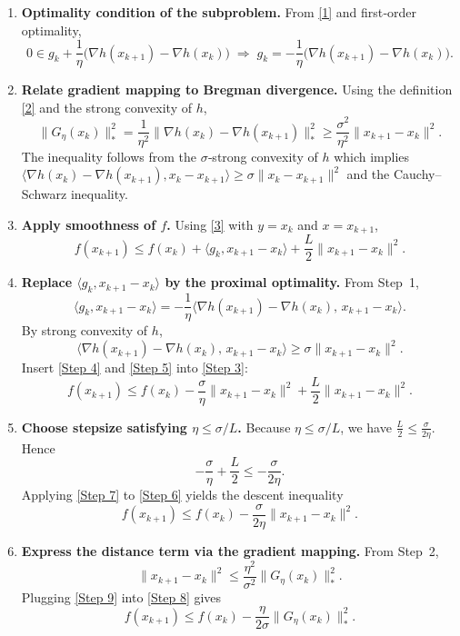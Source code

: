 \documentclass{article}
\begin{document}
\begin{enumerate}
\item \textbf{Optimality condition of the subproblem.}  
From \eqref{1} and first‑order optimality,
\[
0\in g_k+\frac{1}{\eta}\bigl(\nabla h(x_{k+1})-\nabla h(x_k)\bigr)
\;\Longrightarrow\;
g_k = -\frac{1}{\eta}\bigl(\nabla h(x_{k+1})-\nabla h(x_k)\bigr).
\tag{Step 1}
\]
\item \textbf{Relate gradient mapping to Bregman divergence.}  
Using the definition \eqref{2} and the strong convexity of $h$,
\[
\|G_{\eta}(x_k)\|_{*}^{2}
= \frac{1}{\eta^{2}}\| \nabla h(x_k)-\nabla h(x_{k+1})\|_{*}^{2}
\ge \frac{\sigma^{2}}{\eta^{2}}\|x_{k+1}-x_k\|^{2}.
\tag{Step 2}
\]
The inequality follows from the $\sigma$‑strong convexity of $h$ which implies  
$\langle \nabla h(x_k)-\nabla h(x_{k+1}),x_k-x_{k+1}\rangle\ge\sigma\|x_k-x_{k+1}\|^{2}$ and the Cauchy–Schwarz inequality.

\item \textbf{Apply smoothness of $f$.}  
Using \eqref{3} with $y=x_k$ and $x=x_{k+1}$,
\[
f(x_{k+1})\le f(x_k)+\langle g_k, x_{k+1}-x_k\rangle+\frac{L}{2}\|x_{k+1}-x_k\|^{2}.
\tag{Step 3}
\]

\item \textbf{Replace $\langle g_k, x_{k+1}-x_k\rangle$ by the proximal optimality.}  
From Step~1,
\[
\langle g_k, x_{k+1}-x_k\rangle
= -\frac{1}{\eta}\langle \nabla h(x_{k+1})-\nabla h(x_k),\,x_{k+1}-x_k\rangle.
\tag{Step 4}
\]
By strong convexity of $h$,
\[
\langle \nabla h(x_{k+1})-\nabla h(x_k),\,x_{k+1}-x_k\rangle
\ge \sigma\|x_{k+1}-x_k\|^{2}.
\tag{Step 5}
\]
Insert \eqref{Step 4} and \eqref{Step 5} into \eqref{Step 3}:
\[
f(x_{k+1})\le f(x_k)-\frac{\sigma}{\eta}\|x_{k+1}-x_k\|^{2}
                +\frac{L}{2}\|x_{k+1}-x_k\|^{2}.
\tag{Step 6}
\]

\item \textbf{Choose stepsize satisfying $\eta\le\sigma/L$.}  
Because $\eta\le\sigma/L$, we have $\frac{L}{2}\le\frac{\sigma}{2\eta}$. Hence
\[
-\frac{\sigma}{\eta}+\frac{L}{2}
\le -\frac{\sigma}{2\eta}.
\tag{Step 7}
\]
Applying \eqref{Step 7} to \eqref{Step 6} yields the descent inequality
\[
f(x_{k+1})\le f(x_k)-\frac{\sigma}{2\eta}\|x_{k+1}-x_k\|^{2}.
\tag{Step 8}
\]

\item \textbf{Express the distance term via the gradient mapping.}  
From Step~2,
\[
\|x_{k+1}-x_k\|^{2}\le \frac{\eta^{2}}{\sigma^{2}}\|G_{\eta}(x_k)\|_{*}^{2}.
\tag{Step 9}
\]
Plugging \eqref{Step 9} into \eqref{Step 8} gives
\[
f(x_{k+1})\le f(x_k)-\frac{\eta}{2\sigma}\|G_{\eta}(x_k)\|_{*}^{2}.
\tag{Step 10}
\]


\end{enumerate}
\end{document}
